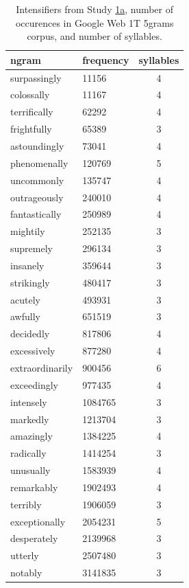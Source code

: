 \documentclass[10pt,letterpaper]{article}
\begin{document}
\begin{table}[ht]
 \begin{center}
 \footnotesize
  \caption{Intensifiers from Study \hyperref[sec:study1a]{1a}, number of occurences in Google Web 1T 5grams corpus, and number of syllables.}
  \label{table:intensifiers_study1a}
  \begin{tabular}{llc}
   \hline
   ngram & frequency & syllables \\
    \hline
    surpassingly & 11156 & 4 \\
    colossally & 11167 & 4 \\
    terrifically & 62292 & 4 \\
    frightfully & 65389 & 3 \\
    astoundingly & 73041 & 4 \\
    phenomenally & 120769 & 5 \\
    uncommonly & 135747 & 4 \\
    outrageously & 240010 & 4 \\
    fantastically & 250989 & 4 \\
    mightily & 252135 & 3 \\
    supremely & 296134 & 3 \\
    insanely & 359644 & 3 \\
    strikingly & 480417 & 3 \\
    acutely & 493931 & 3 \\
    awfully & 651519 & 3 \\
    decidedly & 817806 & 4 \\
    excessively & 877280 & 4 \\
    extraordinarily & 900456 & 6 \\
    exceedingly & 977435 & 4 \\
    intensely & 1084765 & 3 \\
    markedly & 1213704 & 3 \\
    amazingly & 1384225 & 4 \\
    radically & 1414254 & 3 \\
    unusually & 1583939 & 4 \\
    remarkably & 1902493 & 4 \\
    terribly & 1906059 & 3 \\
    exceptionally & 2054231 & 5 \\
    desperately & 2139968 & 3 \\
    utterly & 2507480 & 3 \\
    notably & 3141835 & 3 \\

\end{tabular}
\end{center}
\end{table}
\end{document}
